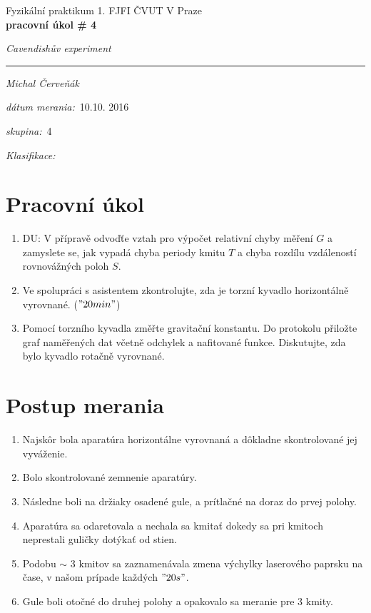 \documentclass[a4paper,10pt]{article}
\begin{document}
\def\mean#1{\left< #1 \right>}
\noindent
{\large Fyzikální praktikum 1.} \hfil {\large FJFI ČVUT V Praze}\\
\noindent
{\large\textbf{pracovní úkol \# 4}}
\begin{center}
{\large\textit{Cavendishův experiment}}
\end{center}
\noindent
\rule{\textwidth}{1px}
\vspace{\baselineskip}

\emph{Michal Červeňák}
\par
\vspace{\baselineskip}
\begin{minipage}[l]{0.5\textwidth}%
\textit{dátum merania:}~10.10. 2016\\%
\par%
\noindent%
\textit{skupina:}~4\\%
\par%
\noindent%
\textit{Klasifikace:}\dotfill\\%
\end{minipage}

\section{Pracovní úkol}
\begin{enumerate}
\item DU: V přípravě odvoďťe vztah pro výpočet relativní chyby měření $G$ a zamyslete
se, jak vypadá chyba periody kmitu $T$ a chyba rozdílu vzdáleností
rovnovážných poloh $S$.
\item Ve spolupráci s asistentem zkontrolujte, zda je torzní kyvadlo horizontálně vyrovnané.
($"20 min"$)
\item Pomocí torzního kyvadla změřte gravitační konstantu. Do protokolu přiložte graf naměřených
dat včetně odchylek a nafitované funkce. Diskutujte, zda bylo kyvadlo rotačně vyrovnané.

\end{enumerate}

\section{Postup merania}

\begin{enumerate}
\item Najskôr bola aparatúra horizontálne vyrovnaná a dôkladne skontrolované jej vyváženie.
\item Bolo skontrolované zemnenie aparatúry.
\item Následne boli na držiaky osadené gule, a prítlačné  na doraz do prvej polohy.
\item Aparatúra sa odaretovala a nechala sa kmitať dokedy sa pri kmitoch neprestali guličky dotýkať od stien.
\item Podobu $\sim$ 3 kmitov sa zaznamenávala zmena výchylky laserového paprsku na čase, v našom prípade každých $"20 s"$.
\item Gule boli otočné do druhej polohy a opakovalo sa meranie pre 3 kmity.
\end{enumerate}
\end{document}
